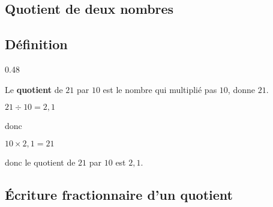 \begin{pageCours}

\section{Quotient de deux nombres}

\subsection{Définition}

{0.48\linewidth}{\begin{Ex}
Le \textbf{quotient} de $21$ par $10$ est le nombre qui multiplié pas $10$, donne $21$.
\begin{center}
$21\div10=2,1$

donc

$10\times2,1=21$
\end{center}

donc le quotient de $21$ par $10$ est $2,1$.
\end{Ex}}

\subsection{Écriture fractionnaire d'un quotient}


\end{pageCours}
